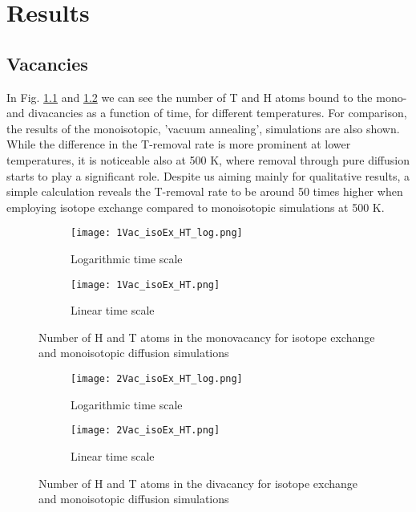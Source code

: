 \chapter{Results}

\section{Vacancies}
In Fig. \ref{Fig:1Vac_results} and \ref{Fig:2Vac_results} we can see the number of T and H atoms bound to the mono- and divacancies as a function of time, for different temperatures. 
For comparison, the results of the monoisotopic, 'vacuum annealing', simulations are also shown. 
While the difference in the T-removal rate is more prominent at lower temperatures, it is noticeable also at 500 K, where removal through pure diffusion starts to play a significant role.
Despite us aiming mainly for qualitative results, a simple calculation reveals the T-removal rate to be around 50 times higher when employing isotope exchange compared to monoisotopic simulations at 500 K. 

\begin{figure}[!ht]
\begin{subfigure}{.5\textwidth}
  \centering
  \texttt{[image: 1Vac\_isoEx\_HT\_log.png]}  
  \caption{Logarithmic time scale}
\end{subfigure}
\begin{subfigure}{.5\textwidth}
  \centering
  \texttt{[image: 1Vac\_isoEx\_HT.png]}  
  \caption{Linear time scale}
\end{subfigure}
\caption{Number of H and T atoms in the monovacancy for isotope exchange and monoisotopic diffusion simulations}
 \label{Fig:1Vac_results} 
\end{figure}


\begin{figure}[!ht]
\begin{subfigure}{.5\textwidth}
  \centering
 \texttt{[image: 2Vac\_isoEx\_HT\_log.png]}  
  \caption{Logarithmic time scale}
\end{subfigure}
\begin{subfigure}{.5\textwidth}
  \centering
  \texttt{[image: 2Vac\_isoEx\_HT.png]}  
  \caption{Linear time scale}
\end{subfigure}
   \caption{Number of H and T atoms in the divacancy for isotope exchange and monoisotopic diffusion simulations}
   \label{Fig:2Vac_results} 
\end{figure}

